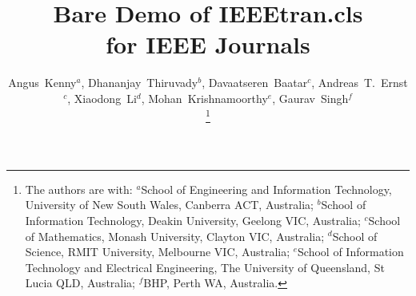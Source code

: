\documentclass[journal]{IEEEtran}
\begin{document}
%
\title{Bare Demo of IEEEtran.cls\\ for IEEE Journals}
%
%
%



\author{Angus~Kenny$^a$, Dhananjay~Thiruvady$^b$, Davaatseren~Baatar$^c$, Andreas~T.~Ernst$^c$, Xiaodong~Li$^d$, Mohan~Krishnamoorthy$^e$, Gaurav~Singh$^f$%

\thanks{The authors are with: $^a$School of Engineering and Information Technology, University of New South Wales, Canberra ACT, Australia; $^b$School of Information Technology, Deakin University, Geelong VIC, Australia; $^c$School of Mathematics, Monash University, Clayton VIC, Australia; $^d$School of Science, RMIT University, Melbourne VIC, Australia; $^e$School of Information Technology and Electrical Engineering, The University of Queensland, St Lucia QLD, Australia; $^f$BHP, Perth WA, Australia.}}
\end{document}

